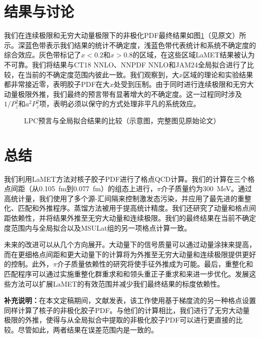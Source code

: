 \documentclass[12pt,a4paper]{ctexart}
\begin{document}
\section{结果与讨论}

我们在连续极限和无穷大动量极限下的非极化PDF最终结果如图\ref{fig:final}（见原文）所示。深蓝色带表示我们结果的统计不确定度，浅蓝色带代表统计和系统不确定度的综合效应。灰色带标记了$x < 0.2$和$x > 0.8$的区域，在这些区域LaMET结果被认为不可靠。我们将结果与CT18 NNLO\cite{CT18}、NNPDF NNLO\cite{NNPDF31}和JAM24全局拟合\cite{JAM24}进行了比较，在当前的不确定度范围内彼此一致。我们观察到，大$x$区域的理论和实验结果都非常接近零，表明胶子PDF在大$x$处受到压制。由于同时进行连续极限和无穷大动量极限外推，我们最终的预言带有显著增大的不确定度。这一过程同时涉及$1/P_z^2$和$a^2 P_z^2$项，表明必须以保守的方式处理非平凡的系统效应。

\begin{figure}[H]
\centering
{}
\caption{LPC预言与全局拟合结果的比较（示意图，完整图见原始论文）}
\label{fig:final}
\end{figure}

\section{总结}

我们利用LaMET方法对核子胶子PDF进行了格点QCD计算。我们的计算在三个格点间距（从0.105~fm到0.077~fm）的组态上进行，$\pi$介子质量约为300~MeV。通过高统计量，我们使用了多个源-汇间隔来控制激发态污染，并应用了最先进的重整化、匹配和外推程序。蒸馏方法被用于提高统计精度。我们还研究了动量和格点间距依赖性，并将结果外推至无穷大动量和连续极限。我们的最终结果在当前不确定度范围内与全局拟合以及MSULat组的另一项格点计算一致。

未来的改进可以从几个方向展开。大动量下的信号质量可以通过动量涂抹来提高，而在更细格点间距和更大动量下的计算将为外推至无穷大动量和连续极限提供更好的控制。此外，$\pi$介子质量依赖性的研究将使手征外推成为可能。最后，重整化和匹配程序可以通过实施重整化群重求和\cite{Zhang2023}和领头重正子重求和\cite{Su2023}来进一步优化。发展这些方法可以扩展LaMET的有效范围并减少我们最终结果的标度依赖性。

\vspace{5pt}
\noindent\textbf{补充说明：}在本文定稿期间，文献\cite{NieMiera2025}发表，该工作使用基于梯度流的另一种格点设置同样计算了核子的非极化胶子PDF。与他们的计算相比，我们进行了无穷大动量极限的外推，使得与从全局拟合中提取的非极化胶子PDF可以进行更直接的比较。尽管如此，两者结果在误差范围内是一致的。
\end{document}
